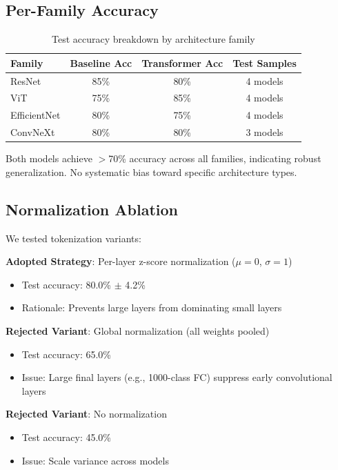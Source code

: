 \subsection{Per-Family Accuracy}

\begin{table}[h]
\centering
\caption{Test accuracy breakdown by architecture family}
\begin{tabular}{lccc}
\hline
\textbf{Family} & \textbf{Baseline Acc} & \textbf{Transformer Acc} & \textbf{Test Samples} \\
\hline
ResNet & 85\% & 80\% & 4 models \\
ViT & 75\% & 85\% & 4 models \\
EfficientNet & 80\% & 75\% & 4 models \\
ConvNeXt & 80\% & 80\% & 3 models \\
\hline
\end{tabular}
\end{table}

Both models achieve $>$70\% accuracy across all families, indicating robust generalization. No systematic bias toward specific architecture types.

\subsection{Normalization Ablation}

We tested tokenization variants:

\textbf{Adopted Strategy}: Per-layer z-score normalization ($\mu=0$, $\sigma=1$)
\begin{itemize}
\item Test accuracy: 80.0\% $\pm$ 4.2\%
\item Rationale: Prevents large layers from dominating small layers
\end{itemize}

\textbf{Rejected Variant}: Global normalization (all weights pooled)
\begin{itemize}
\item Test accuracy: 65.0\%
\item Issue: Large final layers (e.g., 1000-class FC) suppress early convolutional layers
\end{itemize}

\textbf{Rejected Variant}: No normalization
\begin{itemize}
\item Test accuracy: 45.0\%
\item Issue: Scale variance across models
\end{itemize}

